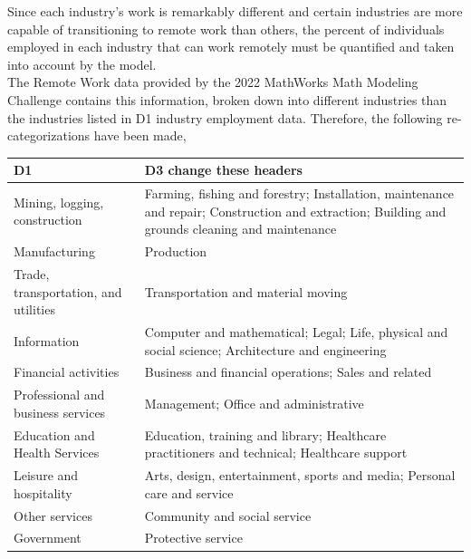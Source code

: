 \documentclass{article}
\begin{document}
Since each industry’s work is remarkably different and certain industries are more capable of transitioning to remote work than others, the percent of individuals employed in each industry that can work remotely must be quantified and taken into account by the model. \\
\indent The Remote Work data provided by the 2022 MathWorks Math Modeling Challenge contains this information, broken down into different industries than the industries listed in D1 industry employment data. Therefore, the following re-categorizations have been made,
\newpage
\begin{table}[h]
\centering
\begin{tabularx}{\linewidth}{|l|>{\raggedright\arraybackslash}X|}
\hline
    \textbf{D1} & \textbf{D3 change these headers} \\ \hline
    Mining, logging, construction & Farming, fishing and forestry; Installation, maintenance and repair; Construction and extraction; Building and grounds cleaning and maintenance \\ \hline
    Manufacturing & Production \\ \hline
    Trade, transportation, and utilities & Transportation and material moving \\ \hline
    Information & Computer and mathematical; Legal; Life, physical and social science; Architecture and engineering \\ \hline
    Financial activities & Business and financial operations; Sales and related \\ \hline
    Professional and business services & Management; Office and administrative \\ \hline
    Education and Health Services & Education, training and library; Healthcare practitioners and technical; Healthcare support \\ \hline
    Leisure and hospitality & Arts, design, entertainment, sports and media; Personal care and service \\ \hline
    Other services & Community and social service \\ \hline
    Government & Protective service \\ \hline
\end{tabularx}
\end{table}
\end{document}

